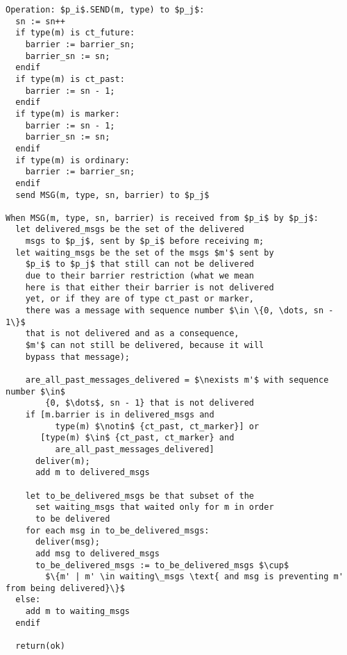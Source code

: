 \documentclass[12pt]{article}
\theoremstyle{plain}
\begin{document}
\clearpage

\begin{lstlisting}[frame=single]
Operation: $p_i$.SEND(m, type) to $p_j$:
  sn := sn++
  if type(m) is ct_future:
    barrier := barrier_sn;
    barrier_sn := sn;
  endif
  if type(m) is ct_past:
    barrier := sn - 1;
  endif
  if type(m) is marker:
    barrier := sn - 1;
    barrier_sn := sn;
  endif
  if type(m) is ordinary:
    barrier := barrier_sn;
  endif
  send MSG(m, type, sn, barrier) to $p_j$

When MSG(m, type, sn, barrier) is received from $p_i$ by $p_j$:
  let delivered_msgs be the set of the delivered 
    msgs to $p_j$, sent by $p_i$ before receiving m;
  let waiting_msgs be the set of the msgs $m'$ sent by
    $p_i$ to $p_j$ that still can not be delivered
    due to their barrier restriction (what we mean
    here is that either their barrier is not delivered
    yet, or if they are of type ct_past or marker,
    there was a message with sequence number $\in \{0, \dots, sn - 1\}$
    that is not delivered and as a consequence, 
    $m'$ can not still be delivered, because it will 
    bypass that message);
    
    are_all_past_messages_delivered = $\nexists m'$ with sequence number $\in$ 
        {0, $\dots$, sn - 1} that is not delivered
    if [m.barrier is in delivered_msgs and
          type(m) $\notin$ {ct_past, ct_marker}] or
       [type(m) $\in$ {ct_past, ct_marker} and
          are_all_past_messages_delivered]
      deliver(m);
      add m to delivered_msgs

    let to_be_delivered_msgs be that subset of the
      set waiting_msgs that waited only for m in order
      to be delivered 
    for each msg in to_be_delivered_msgs:
      deliver(msg);
      add msg to delivered_msgs
      to_be_delivered_msgs := to_be_delivered_msgs $\cup$
        $\{m' | m' \in waiting\_msgs \text{ and msg is preventing m' from being delivered}\}$
  else:
    add m to waiting_msgs
  endif

  return(ok)
 
\end{lstlisting}

\clearpage
\end{document}
